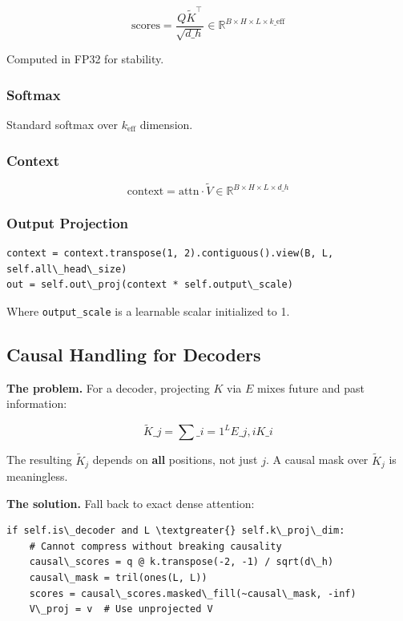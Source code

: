 \[
\text{scores} = \frac{Q \tilde{K}^\top}{\sqrt{d\_h}} \in \mathbb{R}^{B \times H \times L \times k\_\text{eff}}
\tag{4.1}
\]

Computed in FP32 for stability.

\subsubsection{Softmax}

Standard softmax over $k_\text{eff}$ dimension.

\subsubsection{Context}

\[
\text{context} = \text{attn} \cdot \tilde{V} \in \mathbb{R}^{B \times H \times L \times d\_h}
\tag{4.2}
\]

\subsubsection{Output Projection}

\begin{lstlisting}
context = context.transpose(1, 2).contiguous().view(B, L, self.all\_head\_size)
out = self.out\_proj(context * self.output\_scale)
\end{lstlisting}

Where \texttt{output\_scale} is a learnable scalar initialized to 1.

\subsection{Causal Handling for Decoders}

\textbf{The problem.} For a decoder, projecting $K$ via $E$ mixes future and past 
information:

\[
\tilde{K}\_j = \sum\_{i=1}^L E\_{j, i} K\_i
\tag{4.3}
\]

The resulting $\tilde{K}_j$ depends on \textbf{all} positions, not just $j$. A 
causal mask over $\tilde{K}_j$ is meaningless.

\textbf{The solution.} Fall back to exact dense attention:

\begin{lstlisting}
if self.is\_decoder and L \textgreater{} self.k\_proj\_dim:
    # Cannot compress without breaking causality
    causal\_scores = q @ k.transpose(-2, -1) / sqrt(d\_h)
    causal\_mask = tril(ones(L, L))
    scores = causal\_scores.masked\_fill(~causal\_mask, -inf)
    V\_proj = v  # Use unprojected V
\end{lstlisting}

